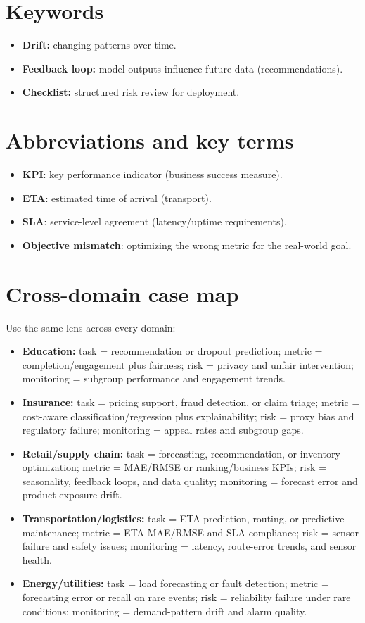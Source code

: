 \documentclass[11pt]{article}
\begin{document}
\section{Keywords}
\begin{itemize}[leftmargin=*]
  \item \textbf{Drift:} changing patterns over time.
  \item \textbf{Feedback loop:} model outputs influence future data (recommendations).
  \item \textbf{Checklist:} structured risk review for deployment.
\end{itemize}

\section{Abbreviations and key terms}
\begin{itemize}[leftmargin=*]
  \item \textbf{KPI}: key performance indicator (business success measure).
  \item \textbf{ETA}: estimated time of arrival (transport).
  \item \textbf{SLA}: service-level agreement (latency/uptime requirements).
  \item \textbf{Objective mismatch}: optimizing the wrong metric for the real-world goal.
\end{itemize}

\section{Cross-domain case map}
Use the same lens across every domain:
\begin{itemize}[leftmargin=*]
  \item \textbf{Education:} task = recommendation or dropout prediction; metric = completion/engagement plus fairness; risk = privacy and unfair intervention; monitoring = subgroup performance and engagement trends.
  \item \textbf{Insurance:} task = pricing support, fraud detection, or claim triage; metric = cost-aware classification/regression plus explainability; risk = proxy bias and regulatory failure; monitoring = appeal rates and subgroup gaps.
  \item \textbf{Retail/supply chain:} task = forecasting, recommendation, or inventory optimization; metric = MAE/RMSE or ranking/business KPIs; risk = seasonality, feedback loops, and data quality; monitoring = forecast error and product-exposure drift.
  \item \textbf{Transportation/logistics:} task = ETA prediction, routing, or predictive maintenance; metric = ETA MAE/RMSE and SLA compliance; risk = sensor failure and safety issues; monitoring = latency, route-error trends, and sensor health.
  \item \textbf{Energy/utilities:} task = load forecasting or fault detection; metric = forecasting error or recall on rare events; risk = reliability failure under rare conditions; monitoring = demand-pattern drift and alarm quality.
\end{itemize}
\end{document}

